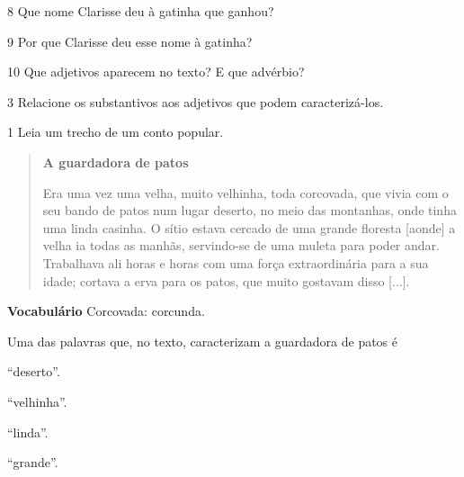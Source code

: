 \num{8} Que nome Clarisse deu à gatinha que ganhou?


\num{9} Por que Clarisse deu esse nome à gatinha?


\num{10} Que adjetivos aparecem no texto? E que advérbio?


\num{3} Relacione os substantivos aos adjetivos que podem caracterizá-los.

%
%
%
%
%
%
%
%
%
%
%


\num{1} Leia um trecho de um conto popular.

\begin{quote}
\textbf{A guardadora de patos}

Era uma vez uma velha, muito velhinha, toda corcovada, que vivia com o
seu bando de patos num lugar deserto, no meio das montanhas, onde tinha
uma linda casinha. O sítio estava cercado de uma grande floresta [aonde] a
velha ia todas as manhãs, servindo-se de uma muleta para poder andar.
Trabalhava ali horas e horas com uma força extraordinária para a sua
idade; cortava a erva para os patos, que muito gostavam disso
{[}...{]}.

\end{quote}

\textbf{Vocabulário}
Corcovada: corcunda.

Uma das palavras que, no texto, caracterizam a guardadora de patos é

\begin{escolha}
\item ``deserto''.

\item ``velhinha''.

\item ``linda''.

\item ``grande''.
\end{escolha}



